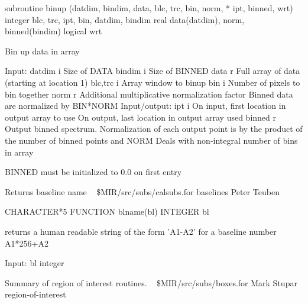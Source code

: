 \par{\tenpoint
{\eightpoint\begintt
      subroutine binup (datdim, bindim, data, blc, trc, bin, norm, 
     *                  ipt, binned, wrt)
      integer blc, trc, ipt, bin, datdim, bindim
      real data(datdim), norm, binned(bindim)
      logical wrt

 Bin up data in array

     Input:
        datdim   i   Size of DATA
        bindim   i   Size of BINNED
        data     r   Full array of data (starting at location 1)
        blc,trc  i   Array window to binup
        bin      i   Number of pixels to bin together
        norm     r   Additional multiplicative normalization factor
                     Binned data are normalized by BIN*NORM
     Input/output:
        ipt      i   On input, first location in output array to use
                     On output, last location in output array used
        binned   r   Output binned spectrum.  Normalization
                     of each output point is by the product of the
                     number of binned points and NORM
                     Deals with non-integral number of bins in array

                     BINNED must be initialized to 0.0 on first entry
\endtt}
\par}
%
\noindent Returns baseline name
\newline \ 
\newline {} \$MIR/src/subs/calsubs.for
\newline {} baselines
\newline {} Peter Teuben
\par{\tenpoint
{\eightpoint\begintt
        CHARACTER*5 FUNCTION blname(bl)
        INTEGER bl

       returns a human readable string of the form 'A1-A2' for
       a baseline number A1*256+A2

       Input:
           bl      integer
\endtt}
\par}
%
\noindent Summary of region of interest routines.
\newline \ 
\newline {} \$MIR/src/subs/boxes.for
\newline {} Mark Stupar
\newline \abox{Keywords:} region-of-interest
